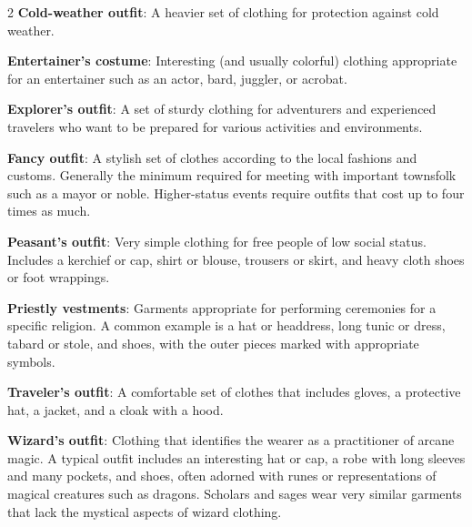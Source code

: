 \begin{multicols}{2}
\textbf{Cold-weather outfit}: A heavier set of clothing for protection against cold weather. 

\textbf{Entertainer’s costume}: Interesting (and usually colorful) clothing appropriate for an entertainer such as an actor, bard, juggler, or acrobat. 

\textbf{Explorer’s outfit}: A set of sturdy clothing for adventurers and experienced travelers who want to be prepared for various activities and environments. 

\textbf{Fancy outfit}: A stylish set of clothes according to the local fashions and customs. Generally the minimum required for meeting with important townsfolk such as a mayor or noble. Higher-status events require outfits that cost up to four times as much. 

\textbf{Peasant’s outfit}: Very simple clothing for free people of low social status. Includes a kerchief or cap, shirt or blouse, trousers or skirt, and heavy cloth shoes or foot wrappings. 

\textbf{Priestly vestments}: Garments appropriate for performing ceremonies for a specific religion. A common example is a hat or headdress, long tunic or dress, tabard or stole, and shoes, with the outer pieces marked with appropriate symbols. 

\textbf{Traveler’s outfit}: A comfortable set of clothes that includes gloves, a protective hat, a jacket, and a cloak with a hood. 

\textbf{Wizard’s outfit}: Clothing that identifies the wearer as a practitioner of arcane magic. A typical outfit includes an interesting hat or cap, a robe with long sleeves and many pockets, and shoes, often adorned with runes or representations of magical creatures such as dragons. Scholars and sages wear very similar garments that lack the mystical aspects of wizard clothing.

\end{multicols}

